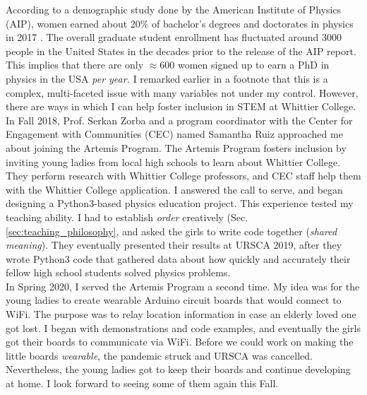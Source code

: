 \documentclass[../../../main.tex]{subfiles}
\begin{document}
According to a demographic study done by the American Institute of Physics (AIP), women earned about 20\% of bachelor's degrees and doctorates in physics in 2017 \cite{aip}.  The overall graduate student enrollment has fluctuated around 3000 people in the United States in the decades prior to the release of the AIP report.  This implies that there are only $\approx 600$ women signed up to earn a PhD in physics in the USA \textit{per year.}  I remarked earlier in a footnote that this is a complex, multi-faceted issue with many variables not under my control.  However, there are ways in which I can help foster inclusion in STEM at Whittier College.
\\
\vspace{0.25cm}
In Fall 2018, Prof. Serkan Zorba and a program coordinator with the Center for Engagement with Communities (CEC) named Samantha Ruiz approached me about joining the Artemis Program.  The Artemis Program fosters inclusion by inviting young ladies from local high schools to learn about Whittier College.  They perform research with Whittier College professors, and CEC staff help them with the Whittier College application.  I answered the call to serve, and began designing a Python3-based physics education project.  This experience tested my teaching ability.  I had to establish \textit{order} creatively (Sec. \ref{sec:teaching_philosophy}, and asked the girls to write code together (\textit{shared meaning}).  They eventually presented their results at URSCA 2019, after they wrote Python3 code that gathered data about how quickly and accurately their fellow high school students solved physics problems.
\\
\vspace{0.25cm}
In Spring 2020, I served the Artemis Program a second time.  My idea was for the young ladies to create wearable Arduino circuit boards that would connect to WiFi.  The purpose was to relay location information in case an elderly loved one got lost.  I began with demonstrations and code examples, and eventually the girls got their boards to communicate via WiFi.  Before we could work on making the little boards \textit{wearable}, the pandemic struck and URSCA was cancelled.  Nevertheless, the young ladies got to keep their boards and continue developing at home.  I look forward to seeing some of them again this Fall.
\end{document}
